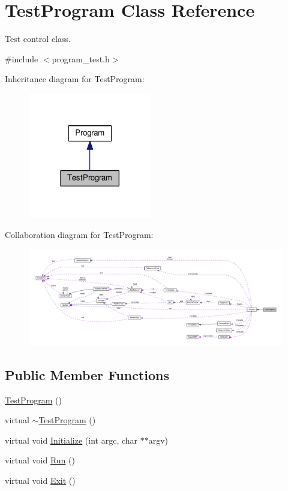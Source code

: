\hypertarget{classTestProgram}{}\section{Test\+Program Class Reference}
\label{classTestProgram}


Test control class.  




{\ttfamily \#include $<$program\+\_\+test.\+h$>$}



Inheritance diagram for Test\+Program\+:
\nopagebreak
\begin{figure}[H]
\begin{center}
\leavevmode
\includegraphics[width=153pt]{d0/d23/classTestProgram__inherit__graph}
\end{center}
\end{figure}


Collaboration diagram for Test\+Program\+:
\nopagebreak
\begin{figure}[H]
\begin{center}
\leavevmode
\includegraphics[width=350pt]{d4/dea/classTestProgram__coll__graph}
\end{center}
\end{figure}
\subsection*{Public Member Functions}
\begin{DoxyCompactItemize}
\item 
\hyperlink{classTestProgram_afeddf2867d35e37690e8323f22e2149a}{Test\+Program} ()
\item 
virtual \hyperlink{classTestProgram_a66322eca03b7f7e921c2c1509f3101fb}{$\sim$\+Test\+Program} ()
\item 
virtual void \hyperlink{classTestProgram_aaa86d196977b0c510c381100b3c4597d}{Initialize} (int argc, char $\ast$$\ast$argv)
\item 
virtual void \hyperlink{classTestProgram_a4d6e3f03e1297ccfa7d3b32fc358aa8d}{Run} ()
\item 
virtual void \hyperlink{classTestProgram_ae1cfa129414df137fb05dc811e9f6b56}{Exit} ()
\end{DoxyCompactItemize}
